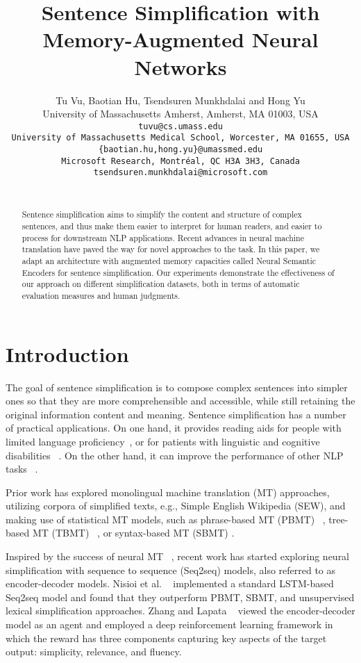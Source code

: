 \documentclass[11pt,a4paper]{article}
\title{Sentence Simplification with Memory-Augmented Neural Networks}
\author{Tu Vu, Baotian Hu, Tsendsuren Munkhdalai and Hong Yu \\
  University of Massachusetts Amherst, Amherst, MA 01003, USA\\
  \tt tuvu@cs.umass.edu\\
  University of Massachusetts Medical School, Worcester, MA 01655, USA\\
  \tt \{baotian.hu,hong.yu\}@umassmed.edu\\
  Microsoft Research, Montr\'eal, QC H3A 3H3, Canada\\
  \tt tsendsuren.munkhdalai@microsoft.com\\ \\}
\date{}
\begin{document}
\maketitle
\begin{abstract}
  Sentence simplification aims to simplify the content and structure of complex sentences, and thus make them easier to interpret for human readers, and easier to process for downstream NLP applications. Recent advances in neural machine translation have paved the way for novel approaches to the task. In this paper, we adapt an architecture with augmented memory capacities called Neural Semantic Encoders \cite{Munkhdalai:17a} for sentence simplification. Our experiments demonstrate the effectiveness of our approach on different simplification datasets, both in terms of automatic evaluation measures and human judgments.
\end{abstract}

\section{Introduction}
The goal of sentence simplification is to compose complex sentences into simpler ones so that they are more comprehensible and accessible, while still retaining the original information content and meaning. Sentence simplification has a number of practical applications.  On one hand, it provides reading aids for people with limited language proficiency~\cite{Watanabe:09,Siddharthan:03}, or for patients with linguistic and cognitive disabilities ~\cite{Carroll:99}. On the other hand, it can improve the performance of other NLP tasks ~\cite{Chandrasekar:96, Knight:00,Klebanov:04}.

Prior work has explored monolingual machine translation (MT) approaches, 
utilizing corpora of simplified texts, e.g., Simple English Wikipedia (SEW), and making use of statistical MT models, such as phrase-based MT (PBMT) ~\cite{Stajner:15,Coster:11,Wubben:12}, tree-based MT (TBMT) ~\cite{Zhu:10,Woodsend:11}, or syntax-based MT (SBMT) \cite{Xu:16}.

Inspired by the success of neural MT ~\cite{Sutskever:14,Cho:14}, recent work has started exploring neural simplification with sequence to sequence (Seq2seq) models, also referred to as encoder-decoder models.  Nisioi et al. ~ implemented a standard LSTM-based Seq2seq model and found that they outperform PBMT, SBMT, and unsupervised lexical simplification approaches. Zhang and Lapata ~\cite{Zhang:17} viewed the encoder-decoder model as an agent and employed a deep reinforcement learning framework in which the reward has three components capturing key aspects of the target output: simplicity, relevance, and fluency. 
\end{document}
